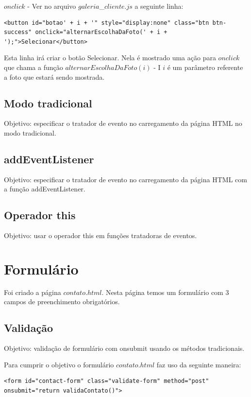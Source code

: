$onclick$ - Ver no arquivo $galeria$\_$cliente.js$ a seguinte linha:

\begin{lstlisting}
<button id="botao' + i + '" style="display:none" class="btn btn-success" onclick="alternarEscolhaDaFoto(' + i + ');">Selecionar</button>
\end{lstlisting}

	Esta linha irá criar o botão Selecionar. Nela é mostrado uma ação para $onclick$ que chama a função $alternarEscolhaDaFoto(i)$ - I $i$ é um parâmetro referente a foto que estará sendo mostrada.

\subsection{Modo tradicional}
Objetivo: especificar o tratador de evento no carregamento da página HTML no modo tradicional.


\subsection{addEventListener}
 Objetivo: especificar o tratador de evento no carregamento da página HTML com a função addEventListener.
 
\subsection{Operador this}
 Objetivo: usar o operador this em funções tratadoras de eventos.
 
 


\section{Formulário}
	Foi criado a página $contato.html$. Nesta página temos um formulário com $3$ campos de preenchimento obrigatórios.
	
\subsection{Validação}
	Objetivo: validação de formulário com onsubmit usando os métodos tradicionais.
	
	Para cumprir o objetivo o formulário $contato.html$ faz uso da seguinte maneira:
\begin{lstlisting}
<form id="contact-form" class="validate-form" method="post" onsubmit="return validaContato()">
\end{lstlisting}

